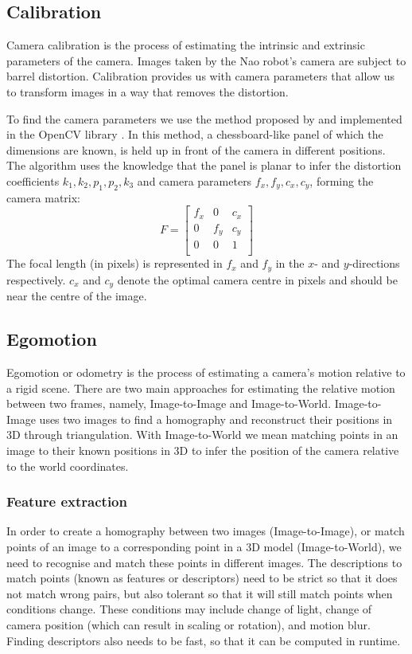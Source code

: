 \documentclass[a4paper]{article}
\begin{document}
\subsection{Calibration}
Camera calibration is the process of estimating the intrinsic and extrinsic
parameters of the camera. Images taken by the Nao robot's camera are subject to
barrel distortion. Calibration provides us with camera parameters that allow us
to transform images in a way that removes the distortion.
\par
To find the camera parameters we use the method proposed by
\cite{zhang1999flexible} and implemented in the OpenCV library
\citep{opencv_library}. In this method, a chessboard-like panel of which the
dimensions are known, is held up in front of the camera in different positions.
The algorithm uses the knowledge that the panel is planar to infer the
distortion coefficients $k_1, k_2, p_1, p_2, k_3$ and camera parameters $f_x,
f_y, c_x, c_y$, forming the camera matrix:
$$
F =
\begin{bmatrix}
	f_x	& 0		& c_x\\
	0		& f_y		& c_y\\
	0		& 0		& 1\\
\end{bmatrix}
$$
The focal length (in pixels) is represented in $f_x$ and $f_y$ in the $x$- and
$y$-directions respectively. $c_x$ and $c_y$ denote the optimal camera centre
in pixels and should be near the centre of the image.


\subsection{Egomotion}
Egomotion or odometry is the process of estimating a camera's motion relative
to a rigid scene. There are two main approaches for estimating the relative
motion between two frames, namely, Image-to-Image and Image-to-World.
Image-to-Image uses two images to find a homography and reconstruct their
positions in 3D through triangulation. With Image-to-World we mean matching
points in an image to their known positions in 3D to infer the position of the
camera relative to the world coordinates.


\subsubsection{Feature extraction}
In order to create a homography between two images (Image-to-Image), or match
points of an image to a corresponding point in a 3D model (Image-to-World), we
need to recognise and match these points in different images. The descriptions
to match points (known as features or descriptors) need to be strict so that it
does not match wrong pairs, but also tolerant so that it will still match
points when conditions change. These conditions may include change of light,
change of camera position (which can result in scaling or rotation), and motion
blur. Finding descriptors also needs to be fast, so that it can be computed in
runtime.
\end{document}
